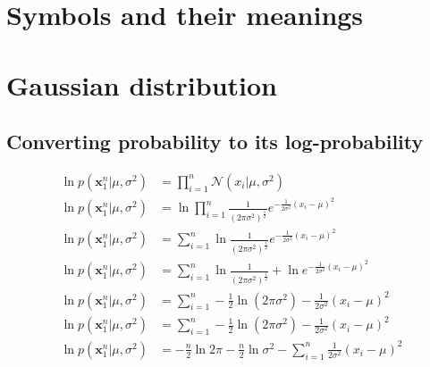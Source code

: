 \appendix
\section{Symbols and their meanings}
\printunsrtglossary[type=symbols,style=long]

\section{Gaussian distribution}
\subsection{Converting probability to its log-probability}\label{AP:log_prob}
\begin{equation}\label{eq:ap_logprob}
\begin{split}
    \ln p(\textbf{x}^n_1 | \mu, \sigma^2) &= \prod_{i=1}^{n}{\mathcal{N}(x_i|\mu, \sigma^2)}\\
    \ln p(\textbf{x}^n_1 | \mu, \sigma^2) &= \ln \prod_{i=1}^{n}\frac{1}{(2 \pi \sigma ^2)^{\frac{1}{2}}} e^{- \frac{1}{2\sigma ^2}(x_i - \mu)^2}\\
    \ln p(\textbf{x}^n_1 | \mu, \sigma^2) &= \sum_{i=1}^{n} \ln \frac{1}{(2 \pi \sigma ^2)^{\frac{1}{2}}} e^{- \frac{1}{2\sigma ^2}(x_i - \mu)^2}\\
    \ln p(\textbf{x}^n_1 | \mu, \sigma^2) &= \sum_{i=1}^{n} \ln \frac{1}{(2 \pi \sigma ^2)^{\frac{1}{2}}} + \ln e^{- \frac{1}{2\sigma ^2}(x_i - \mu)^2}\\
    \ln p(\textbf{x}^n_1 | \mu, \sigma^2) &= \sum_{i=1}^{n} -\frac{1}{2} \ln (2 \pi \sigma ^2) - \frac{1}{2\sigma ^2}(x_i - \mu)^2\\
    \ln p(\textbf{x}^n_1 | \mu, \sigma^2) &= \sum_{i=1}^{n} -\frac{1}{2} \ln (2 \pi \sigma ^2) - \frac{1}{2\sigma ^2}(x_i - \mu)^2\\
    \ln p(\textbf{x}^n_1 | \mu, \sigma^2) &= -\frac{n}{2} \ln 2 \pi -\frac{n}{2} \ln \sigma ^2 - \sum_{i=1}^{n} \frac{1}{2\sigma ^2}(x_i - \mu)^2\\
\end{split}
\end{equation}

